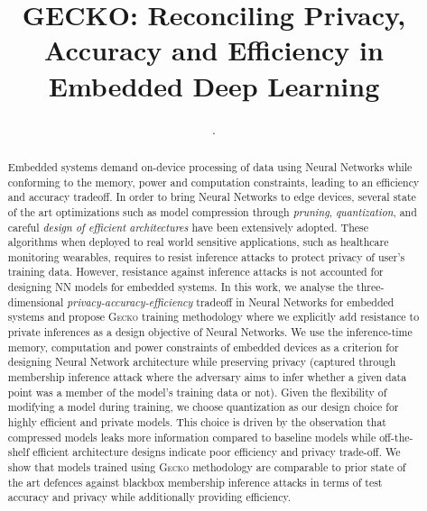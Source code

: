 \documentclass[sigconf]{acmart}
\newcommand{\method}{{\scshape Gecko}}
\begin{document}
\title{GECKO: Reconciling Privacy, Accuracy and Efficiency in Embedded Deep Learning}

\author{.}


\begin{abstract}
Embedded systems demand on-device processing of data using Neural Networks while conforming to the memory, power and computation constraints, leading to an efficiency and accuracy tradeoff.
In order to bring Neural Networks to edge devices, several state of the art optimizations such as model compression through \textit{pruning}, \textit{quantization}, and careful \textit{design of efficient architectures} have been extensively adopted.
These algorithms when deployed to real world sensitive applications, such as healthcare monitoring wearables, requires to resist inference attacks to protect privacy of user's training data. However, resistance against inference attacks is not accounted for designing NN models for embedded systems.
In this work, we analyse the three-dimensional \textit{privacy-accuracy-efficiency} tradeoff in Neural Networks for embedded systems and propose \method\hspace{0.02in} training methodology where we explicitly add resistance to private inferences as a design objective of Neural Networks.
We use the inference-time memory, computation and power constraints of embedded devices as a criterion for designing Neural Network architecture while preserving privacy (captured through membership inference attack where the adversary aims to infer whether a given data point was a member of the model's training data or not).
Given the flexibility of modifying a model during training, we choose quantization as our design choice for highly efficient and private models.
This choice is driven by the observation that compressed models leaks more information compared to baseline models while off-the-shelf efficient architecture designs indicate poor efficiency and privacy trade-off.
We show that models trained using \method\hspace{0.02in} methodology are comparable to prior state of the art defences against blackbox membership inference attacks in terms of test accuracy and privacy while additionally providing efficiency.


\end{abstract}
\end{document}
